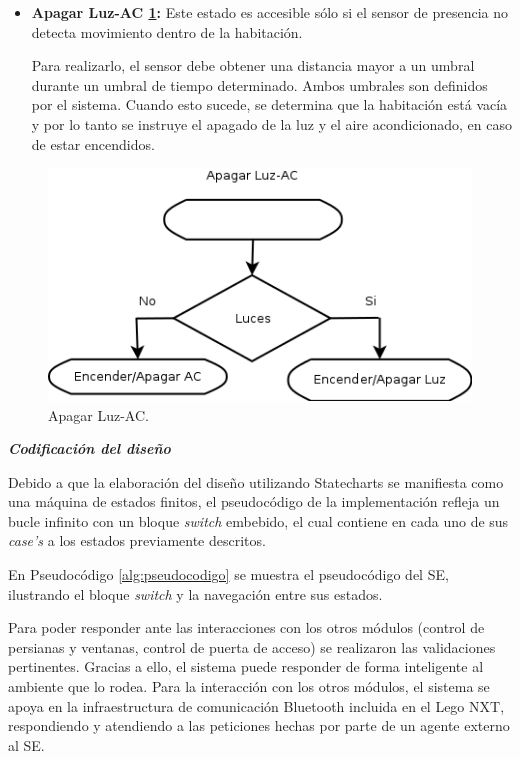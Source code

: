 \documentclass[journal]{IEEEtran}
\begin{document}
\begin{itemize}
	  \item \textbf{Apagar Luz-AC \ref{fig:estados4}:} Este estado es accesible sólo si el sensor de presencia no detecta movimiento dentro de la habitación.

	  Para realizarlo, el sensor debe obtener una distancia mayor a un umbral durante un umbral de tiempo determinado. Ambos umbrales son definidos por el sistema.
	  Cuando esto sucede, se determina que la habitación está vacía y por lo tanto se instruye el apagado de la luz y el aire acondicionado, en caso de estar encendidos.
\end{itemize} 

\begin{figure}
\centering
\includegraphics[width=\columnwidth]{diagramas/Apagar_luz_AC.png}
\caption{Apagar Luz-AC.}
\label{fig:estados4}
\end{figure}


\textbf{\emph{Codificación del diseño}}

Debido a que la elaboración del diseño utilizando Statecharts se manifiesta como una máquina de estados finitos, el pseudocódigo de la implementación refleja un bucle infinito con un bloque \emph{switch} embebido, el cual contiene en cada uno de sus \emph{case’s} a los estados previamente descritos.

En Pseudocódigo \ref{alg:pseudocodigo} se muestra el pseudocódigo del SE, ilustrando el bloque \emph{switch} y la navegación entre sus estados.

Para poder responder ante las interacciones con los otros módulos (control de persianas y ventanas, control de puerta de acceso) se realizaron las validaciones pertinentes.
Gracias a ello, el sistema puede responder de forma inteligente al ambiente que lo rodea.
Para la interacción con los otros módulos, el sistema se apoya en la infraestructura de comunicación Bluetooth incluida en el Lego NXT, respondiendo y atendiendo a las peticiones hechas por parte de un agente externo al SE. 
\end{document}
